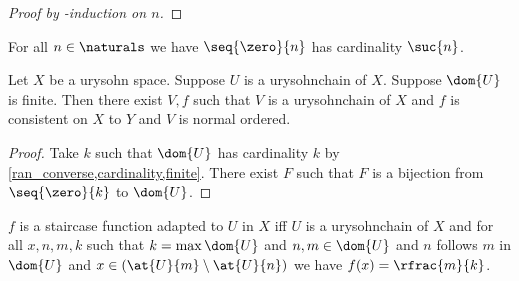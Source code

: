 \begin{proof} [Proof by \in-induction on $n$]
    
    
\end{proof}

\begin{proposition}\label{seq_zero_to_n_isomorph_to_suc_n}
    For all $n \in \naturals$ we have $\seq{\zero}{n}$ has cardinality $\suc{n}$.
\end{proposition}

\begin{proposition}\label{existence_normal_ordered_urysohn}
    Let $X$ be a urysohn space.
    Suppose $U$ is a urysohnchain of $X$.
    Suppose $\dom{U}$ is finite.
    Then there exist $V,f$ such that $V$ is a urysohnchain of $X$ and $f$ is consistent on $X$ to $Y$ and $V$ is normal ordered.
\end{proposition}
\begin{proof}
    Take $k$ such that $\dom{U}$ has cardinality $k$ by \cref{ran_converse,cardinality,finite}.
    There exist $F$ such that $F$ is a bijection from $\seq{\zero}{k}$ to $\dom{U}$.


\end{proof}


\begin{definition}\label{staircase}
    $f$ is a staircase function adapted to $U$ in $X$ iff $U$ is a urysohnchain of $X$ and for all $x,n,m,k$ such that $k = \max{\dom{U}}$ and $n,m \in \dom{U}$ and $n$ follows $m$ in $\dom{U}$ and $x \in (\at{U}{m} \setminus \at{U}{n})$ we have $f(x)= \rfrac{m}{k}$.
\end{definition}

